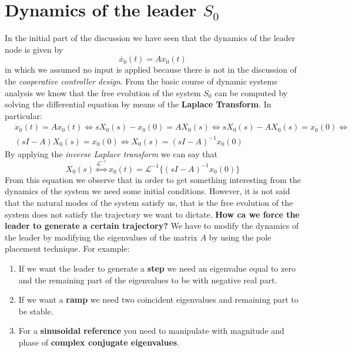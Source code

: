 \section{Dynamics of the leader $S_0$}
\noindent 
In the initial part of the discussion we have seen that the dynamics of the leader node is given by 
\begin{equation}
    \dot{x_0}(t) = A x_0(t)
\end{equation}
in which we assumed no input is applied because there is not in the discussion of the \textit{cooperative controller design}. From the basic course of dynamic systems analysis we know that the free evolution of the system $S_0$ can be computed by solving the differential equation by means of the \textbf{Laplace Transform}. In particular:
\begin{align*}
    &\dot{x}_0(t) = Ax_0(t) \iff 
    sX_0(s) - x_0(0) = A X_0(s) \iff 
    sX_0(s)-AX_0(s) = x_0(0) \iff\\
    &(sI-A)X_0(s) = x_0(0) \iff
    X_0(s) = (sI-A)^{-1} x_0(0)  
\end{align*}
By applying the \textit{inverse Laplace transform} we can say that
\begin{equation}
    X_0(s) \overset{\mathcal{L}^{-1}}{\iff} x_0(t) = \mathcal{L}^{-1} \{
        (sI-A)^{-1} x_0(0)
    \}
\end{equation}
From this equation we observe that in order to get something interesting from the dynamics of the system we need some initial conditions. However, it is not said that the natural modes of the system satisfy us, that is the free evolution of the system does not satisfy the trajectory we want to dictate. \textbf{How ca we force the leader to generate a certain trajectory?} We have to modify the dynamics of the leader by modifying the eigenvalues of the matrix $A$ by using the pole placement technique. For example: 
\begin{enumerate}
    \item If we want the leader to generate a \textbf{step} we need an eigenvalue equal to zero and the remaining part of the eigenvalues to be with negative real part.
    \item If we want a \textbf{ramp} we need two coincident eigenvalues and remaining part to be stable.
    \item For a \textbf{sinusoidal reference} you need to manipulate with magnitude and phase of \textbf{complex conjugate eigenvalues}.
\end{enumerate}

